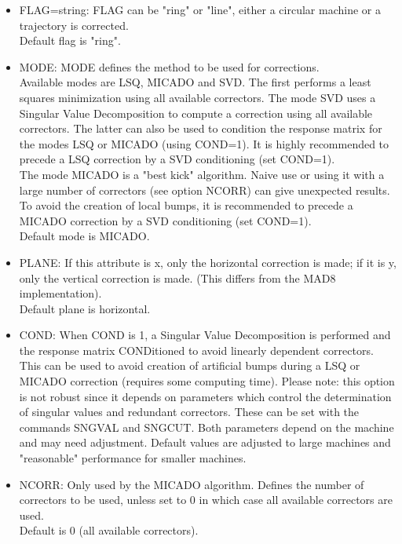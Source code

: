 \begin{itemize}
   \item FLAG=string: FLAG can be "ring" or "line", either a circular machine
     or a trajectory is corrected.   
     \\ Default flag is "ring". 

   \item MODE: MODE defines the method to be used for corrections. 
     \\ Available modes are LSQ, MICADO and SVD.  The first performs a
     least squares minimization using all available correctors. The mode
     SVD uses a Singular Value Decomposition to compute a correction
     using all available correctors. The latter can also be used to
     condition the response matrix for the modes LSQ or MICADO (using
     COND=1). It is highly recommended to precede a LSQ correction by a
     SVD conditioning (set COND=1).  
     \\ The mode MICADO is a "best kick" algorithm. Naive use or using
     it with a large number of correctors (see option NCORR) can give
     unexpected results. To avoid the creation of local bumps, it is
     recommended to precede a MICADO correction by a SVD conditioning
     (set COND=1).  
     \\ Default mode is MICADO.            

   \item PLANE: If this attribute is x, only the horizontal correction
     is made; if it is y, only the vertical correction is made. (This
     differs from the MAD8 implementation).  
     \\ Default plane is horizontal. 

   \item COND: When COND is 1, a Singular Value Decomposition is
     performed and  the response matrix CONDitioned to avoid linearly
     dependent correctors. This can be used to avoid creation of
     artificial bumps during a LSQ or MICADO correction (requires some
     computing time).  Please note: this option is not robust since it
     depends on parameters which control the determination of singular
     values and redundant correctors. These can be set with the commands
     SNGVAL and SNGCUT. Both parameters depend on the machine and may
     need adjustment. Default values are adjusted to large machines and
     "reasonable" performance for smaller machines.  
     \\

   \item NCORR: Only used by the MICADO algorithm. Defines the number of
     correctors to be used, unless set to 0 in which case all available
     correctors are used.  
     \\ Default is 0 (all available correctors). 


\end{itemize}
